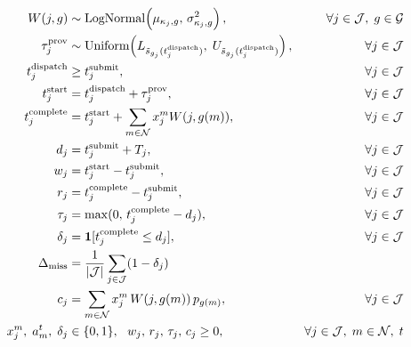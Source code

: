 \begin{align}
W(j,g) &\sim \text{LogNormal}\!\left(\mu_{\kappa_j,g},\, \sigma_{\kappa_j,g}^2\right), & \forall j \in \mathcal{J},\; g \in \mathcal{G} \label{eq:servicetime}\\
\tau^{\text{prov}}_j &\sim \text{Uniform}\!\left(L_{\tilde s_{g_j}(t_j^{\text{dispatch}})},\; U_{\tilde s_{g_j}(t_j^{\text{dispatch}})}\right), & \forall j \in \mathcal{J} \label{eq:provdelay}\\
t_j^{\text{dispatch}} &\geq t_j^{\text{submit}}, & \forall j \in \mathcal{J} \label{eq:release}\\
t_j^{\text{start}} &= t_j^{\text{dispatch}} + \tau^{\text{prov}}_j, & \forall j \in \mathcal{J} \label{eq:starttime}\\
t_j^{\text{complete}} &= t_j^{\text{start}} + \sum_{m \in \mathcal{N}} x_j^m W(j,g(m)), & \forall j \in \mathcal{J} \label{eq:completion}\\
d_j &= t_j^{\text{submit}} + T_j, & \forall j \in \mathcal{J} \label{eq:deadline_window}\\
w_j &= t_j^{\text{start}} - t_j^{\text{submit}}, & \forall j \in \mathcal{J} \label{eq:wait}\\
r_j &= t_j^{\text{complete}} - t_j^{\text{submit}}, & \forall j \in \mathcal{J} \label{eq:resp}\\
\tau_j &= \max(0,\, t_j^{\text{complete}} - d_j), & \forall j \in \mathcal{J} \label{eq:tardiness}\\
\delta_j &= \mathbf{1}[t_j^{\text{complete}} \leq d_j], & \forall j \in \mathcal{J} \label{eq:adherence}\\
\Delta_{\text{miss}} &= \frac{1}{|\mathcal{J}|}\sum_{j \in \mathcal{J}} (1 - \delta_j) \label{eq:missrate}\\
c_j &= \sum_{m \in \mathcal{N}} x_j^m \, W(j, g(m))\, p_{g(m)}, & \forall j \in \mathcal{J} \label{eq:cost_cost}\\
x_j^m,\; a_m^t,\; \delta_j &\in \{0,1\},\ \ w_j,\, r_j,\, \tau_j,\, c_j \geq 0, & \forall j \in \mathcal{J},\; m \in \mathcal{N},\; t \label{eq:domains}
\end{align}
\endgroup

